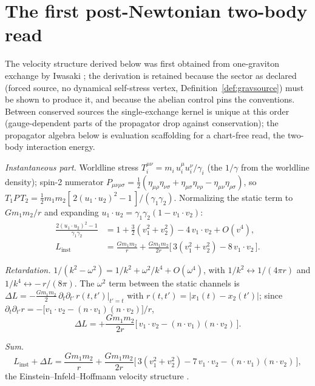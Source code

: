 \documentclass[11pt]{article}
\theoremstyle{definition}
\theoremstyle{remark}
\begin{document}
\section{The first post-Newtonian two-body read}\label{app:eih}
The velocity structure derived below was first obtained from
one-graviton exchange by Iwasaki \cite{iwasaki}; the derivation is
retained because the sector as declared (forced source, no dynamical
self-stress vertex, Definition~\ref{def:gravsource}) must be shown
to produce it, and because the abelian control pins the conventions.
Between conserved sources the single-exchange kernel is unique at this
order (gauge-dependent parts of the propagator drop against
conservation); the propagator algebra below is evaluation scaffolding
for a chart-free read, the two-body interaction energy.

\emph{Instantaneous part.}  Worldline stress $T_i^{\mu\nu} = m_i\,
u_i^\mu u_i^\nu/\gamma_i$ (the $1/\gamma$ from the worldline density);
spin-2 numerator $P_{\mu\nu\rho\sigma} = \tfrac12(\eta_{\mu\rho}
\eta_{\nu\sigma} + \eta_{\mu\sigma}\eta_{\nu\rho} -
\eta_{\mu\nu}\eta_{\rho\sigma})$, so $T_1 P\, T_2 = \tfrac12 m_1 m_2
[\,2(u_1 \cdot u_2)^2 - 1\,]/(\gamma_1\gamma_2)$.  Normalizing the
static term to $Gm_1m_2/r$ and expanding $u_1 \cdot u_2 =
\gamma_1\gamma_2(1 - v_1 \cdot v_2)$:
\[
\begin{aligned}
\frac{2(u_1 \cdot u_2)^2 - 1}{\gamma_1\gamma_2}
  &= 1 + \tfrac32(v_1^2 + v_2^2)
     - 4\, v_1 \cdot v_2 + O(v^4), \\
L_{\mathrm{inst}}
  &= \frac{Gm_1m_2}{r}
     + \frac{Gm_1m_2}{2r}
       \big[\,3(v_1^2 + v_2^2) - 8\, v_1 \cdot v_2\,\big].
\end{aligned}
\]

\emph{Retardation.}  $1/(k^2 - \omega^2) = 1/k^2 + \omega^2/k^4 +
O(\omega^4)$, with $1/k^2 \leftrightarrow 1/(4\pi r)$ and $1/k^4
\leftrightarrow -\,r/(8\pi)$.  The $\omega^2$ term between the static
channels is $\Delta L = -\tfrac{G m_1 m_2}{2}\,\partial_t
\partial_{t'}\, r(t,t')\big|_{t'=t}$ with $r(t,t') = |x_1(t) -
x_2(t')|$; since $\partial_t \partial_{t'} r = -\big[v_1 \cdot v_2 -
(n \cdot v_1)(n \cdot v_2)\big]/r$,
\[
\Delta L = +\frac{Gm_1m_2}{2r}\big[\,v_1 \cdot v_2 -
(n \cdot v_1)(n \cdot v_2)\,\big].
\]

\emph{Sum.}
\[
L_{\mathrm{inst}} + \Delta L = \frac{Gm_1m_2}{r} +
\frac{Gm_1m_2}{2r}\big[\,3(v_1^2 + v_2^2) - 7\, v_1 \cdot v_2 -
(n \cdot v_1)(n \cdot v_2)\,\big],
\]
the Einstein--Infeld--Hoffmann velocity structure \cite{eih}.
\end{document}
